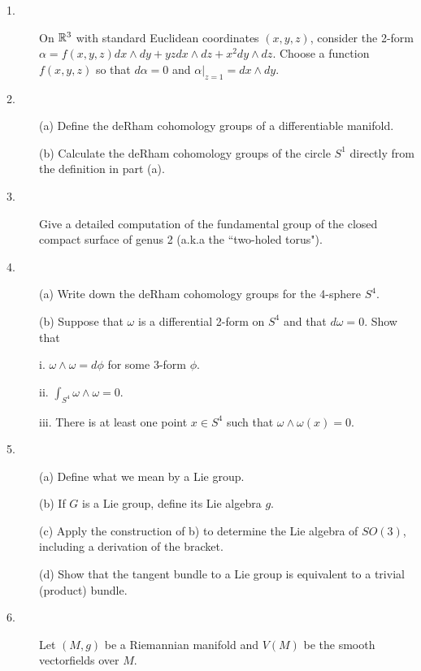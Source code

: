 \documentclass{article}
\begin{document}
\begin{description}

\item[1.]
On $\Bbb R^3$ with standard Euclidean coordinates $(x,y,z)$, consider the
2-form $\alpha = f(x,y,z) dx \wedge dy + yzdx \wedge dz+ x^2 dy \wedge dz$.
Choose a function $f(x,y,z)$ so that $d \alpha =0$ and
$\alpha |_{z=1} = dx \wedge dy$.

\item[2.] (a)
Define the deRham cohomology groups of a differentiable manifold.

\item[\quad] (b)
Calculate the deRham cohomology groups of the circle $S^1$ directly
from the definition in part (a).

\item[3.]
Give a detailed computation of the fundamental group of the closed compact
surface of genus 2 (a.k.a the ``two-holed torus").

\item[4.] (a)
Write down the deRham cohomology groups for the 4-sphere $S^4$.

\item[\quad] (b)
Suppose that $\omega$ is a differential 2-form on $S^4$ and that
$d \omega = 0$. Show that

\item[\quad] \quad i.
$\omega \wedge \omega = d \phi$ for some 3-form $\phi$.

\item[\quad] \quad ii.
$\int_{S^4} \omega \wedge \omega = 0$.

\item[\quad] \quad iii.
There is at least one point $x \in S^4$ such that
$\omega \wedge \omega (x) = 0$.

\item[5.] (a)
Define what we mean by a Lie group.

\item[\quad] (b)
If $G$ is a Lie group, define its Lie algebra $g$.

\item[\quad] (c)
Apply the construction of b) to determine the Lie algebra of $SO(3)$,
including a derivation of the bracket.

\item[\quad] (d)
Show that the tangent bundle to a Lie group is equivalent to a trivial
(product) bundle.

\item[6.]
Let $(M,g)$ be a Riemannian manifold and $V(M)$ be the smooth vectorfields
over $M$.


\end{description}
\end{document}
